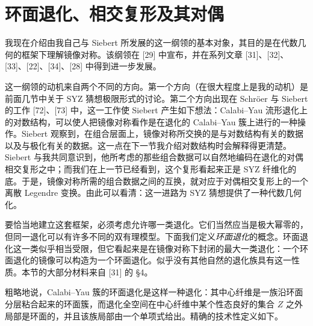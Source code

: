 \section{环面退化、相交复形及其对偶}
我现在介绍由我自己与 Siebert 所发展的这一纲领的基本对象，其目的是在代数几何的框架下理解镜像对称。该纲领在 [29] 中宣布，并在系列文章 [31]、[32]、[33]、[22]、[34]、[28] 中得到进一步发展。

这一纲领的动机来自两个不同的方向。第一个方向（在很大程度上是我的动机）是前面几节中关于 SYZ 猜想极限形式的讨论。第二个方向出现在 Schröer 与 Siebert 的工作 [72]、[73] 中，这一工作使 Siebert 产生如下想法：Calabi--Yau 流形退化上的对数结构，可以使人把镜像对称看作是在退化的 Calabi--Yau 簇上进行的一种操作。Siebert 观察到，在组合层面上，镜像对称所交换的是与对数结构有关的数据以及与极化有关的数据。这一点在下一节我介绍对数结构时会解释得更清楚。Siebert 与我共同意识到，他所考虑的那些组合数据可以自然地编码在退化的对偶相交复形之中；而我们在上一节已经看到，这个复形看起来正是 SYZ 纤维化的底。于是，镜像对称所需的组合数据之间的互换，就对应于对偶相交复形上的一个离散 Legendre 变换。由此可以看清：这一进路为 SYZ 猜想提供了一种代数几何化。

要恰当地建立这套框架，必须考虑允许哪一类退化。它们当然应当是极大幂零的，但同一退化可以有许多不同的双有理模型。下面我们定义\emph{环面退化}的概念。环面退化这一类似乎相当受限，但它看起来是在镜像对称下封闭的最大一类退化：一个环面退化的镜像可以构造为一个环面退化。似乎没有其他自然的退化族具有这一性质。本节的大部分材料来自 [31] 的 §4。

粗略地说，Calabi--Yau 簇的环面退化是这样一种退化：其中心纤维是一族沿环面分层粘合起来的环面簇，而退化全空间在中心纤维中某个性态良好的集合 $Z$ 之外局部是环面的，并且该族局部由一个单项式给出。精确的技术性定义如下。

